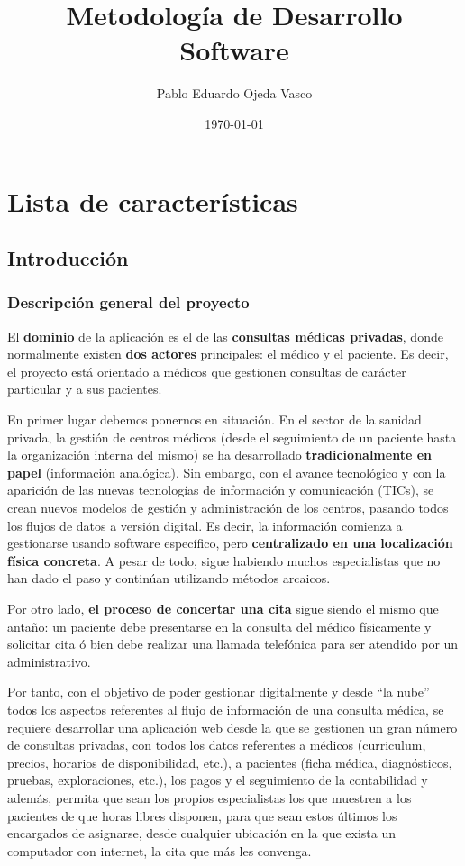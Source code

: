 \documentclass[a4paper,oneside,11pt]{book}
\begin{document}
\title{Metodología de Desarrollo Software}
\author{Pablo Eduardo Ojeda Vasco}
\date{\today}

\maketitle
\chapter{Lista de características}
\section{Introducción}
\subsection{Descripción general del proyecto}
El {\bf dominio} de la aplicación es el de las {\bf consultas médicas privadas}, donde normalmente existen {\bf dos actores} principales: el médico y el paciente. Es decir, el proyecto está orientado a médicos que gestionen consultas de carácter particular y a sus pacientes.

	En primer lugar debemos ponernos en situación. En el sector de la sanidad privada, la gestión de centros médicos (desde el seguimiento de un paciente hasta la organización interna del mismo) se ha desarrollado {\bf tradicionalmente en papel} (información analógica). Sin embargo, con el avance tecnológico y con la aparición de las nuevas tecnologías de información y comunicación (TICs), se crean nuevos modelos de gestión y administración de los centros, pasando todos los flujos de datos a versión digital. Es decir, la información comienza a gestionarse usando software específico, pero {\bf centralizado en una localización física concreta}. A pesar de todo, sigue habiendo muchos especialistas que no han dado el paso y continúan utilizando métodos arcaicos.

	Por otro lado, {\bf el proceso de concertar una cita} sigue siendo el mismo que antaño: un paciente debe presentarse en la consulta del médico físicamente y solicitar cita ó bien debe realizar una llamada telefónica para ser atendido por un administrativo.

	Por tanto, con el objetivo de poder gestionar digitalmente y desde “la nube” todos los aspectos referentes al flujo de información de una consulta médica, se requiere desarrollar una aplicación web desde la que se gestionen un gran número de consultas privadas, con todos los datos referentes a médicos (curriculum, precios, horarios de disponibilidad, etc.), a pacientes (ficha médica, diagnósticos, pruebas, exploraciones, etc.), los pagos y el seguimiento de la contabilidad y además, permita que sean los propios especialistas los que muestren a los pacientes de que horas libres disponen, para que sean estos últimos los encargados de asignarse, desde cualquier ubicación en la que exista un computador con internet, la cita que más les convenga.
\end{document}
